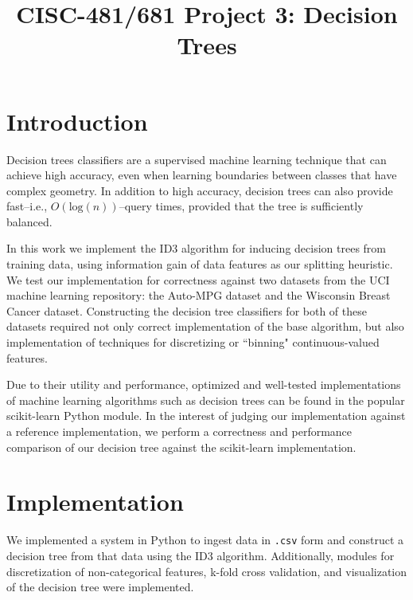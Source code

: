 \documentclass[12pt, conference, compsocconf]{IEEEtran}
\begin{document}
\title{CISC-481/681 Project 3: Decision Trees}

\author{
}

\maketitle

\section{Introduction}
Decision trees classifiers are a supervised machine learning technique that can achieve high accuracy, even when learning boundaries between classes that have complex geometry. 
In addition to high accuracy, decision trees can also provide fast--i.e., $O(\text{log}(n))$--query times, provided that the tree is sufficiently balanced. 

In this work we implement the ID3 algorithm for inducing decision trees from training data, using information gain of data features as our splitting heuristic. 
We test our implementation for correctness against two datasets from the UCI machine learning repository: the Auto-MPG dataset and the Wisconsin Breast Cancer dataset.
Constructing the decision tree classifiers for both of these datasets required not only correct implementation of the base algorithm, but also implementation of techniques for discretizing or ``binning" continuous-valued features.

Due to their utility and performance, optimized and well-tested implementations of machine learning algorithms such as decision trees can be found in the popular scikit-learn Python module.
In the interest of judging our implementation against a reference implementation, we perform a correctness and performance comparison of our decision tree against the scikit-learn implementation.

\section{Implementation}
We implemented a system in Python to ingest data in \texttt{.csv} form and construct a decision tree from that data using the ID3 algorithm.
Additionally, modules for discretization of non-categorical features, k-fold cross validation, and visualization of the decision tree were implemented.
\end{document}
